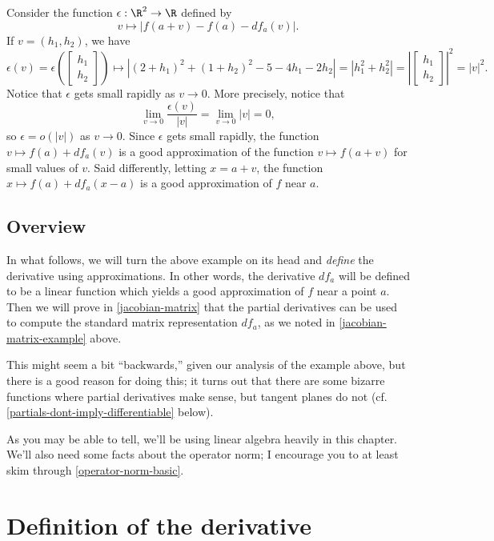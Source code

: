 Consider the function $\epsilon : \R^2 \to \R$ defined by
\[ v \mapsto |f(a+v)-f(a)-df_a(v)|.  \]
If $v = (h_1, h_2)$, we have
\[ \epsilon(v) = \epsilon\left( \begin{bmatrix} h_1 \\ h_2 \end{bmatrix} \right) \mapsto |(2+h_1)^2 + (1+h_2)^2 - 5 - 4h_1 - 2h_2| = |h_1^2 + h_2^2| = \left|\begin{bmatrix} h_1 \\ h_2 \end{bmatrix} \right|^2 = |v|^2. \]
Notice that $\epsilon$ gets small rapidly as $v \to 0$. More precisely, notice that
\[ \lim_{v \to 0} \frac{\epsilon(v)}{|v|} = \lim_{v \to 0} |v| = 0, \]
so $\epsilon = o(|v|)$ as $v \to 0$. Since $\epsilon$ gets small rapidly, the function $v \mapsto f(a) + df_a(v)$ is a good approximation of the function $v \mapsto f(a+v)$ for small values of $v$. Said differently, letting $x = a + v$, the function $x \mapsto f(a) + df_a(x-a)$ is a good approximation of $f$ near $a$. 

\subsection{Overview}

In what follows, we will turn the above example on its head and \emph{define} the derivative using approximations. In other words, the derivative $df_a$ will be defined to be a linear function which yields a good approximation of $f$ near a point $a$. Then we will prove in \cref{jacobian-matrix} that the partial derivatives can be used to compute the standard matrix representation $df_a$, as we noted in \cref{jacobian-matrix-example} above. 

This might seem a bit ``backwards,'' given our analysis of the example above, but there is a good reason for doing this; it turns out that there are some bizarre functions where partial derivatives make sense, but tangent planes do not (cf. \cref{partials-dont-imply-differentiable} below).

As you may be able to tell, we'll be using linear algebra heavily in this chapter. We'll also need some facts about the operator norm; I encourage you to at least skim through \cref{operator-norm-basic}. 

\section{Definition of the derivative}

